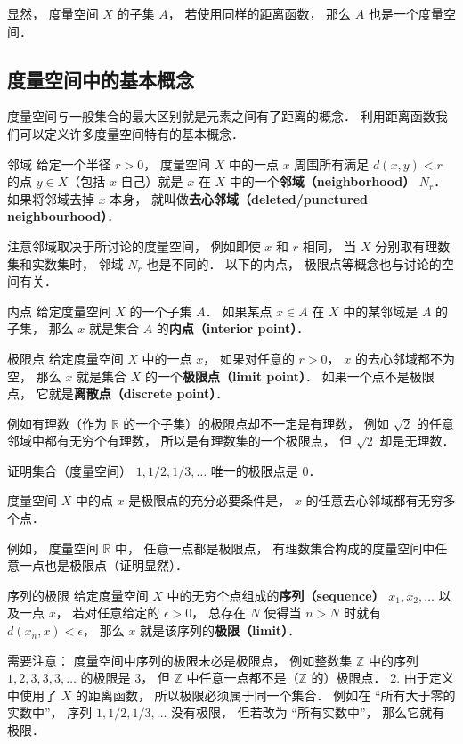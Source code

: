 显然， 度量空间 $X$ 的子集 $A$， 若使用同样的距离函数， 那么 $A$ 也是一个度量空间．

\subsection{度量空间中的基本概念}
度量空间与一般集合的最大区别就是元素之间有了距离的概念． 利用距离函数我们可以定义许多度量空间特有的基本概念．

\begin{definition}{邻域}
给定一个半径 $r > 0$， 度量空间 $X$ 中的一点 $x$ 周围所有满足 $d(x, y) < r$ 的点 $y \in X$（包括 $x$ 自己）就是 $x$ 在 $X$ 中的一个\textbf{邻域（neighborhood）} $N_r$． 如果将邻域去掉 $x$ 本身， 就叫做\textbf{去心邻域（deleted/punctured neighbourhood）}．
\end{definition}
注意邻域取决于所讨论的度量空间， 例如即使 $x$ 和 $r$ 相同， 当 $X$ 分别取有理数集和实数集时， 邻域 $N_r$ 也是不同的． 以下的内点， 极限点等概念也与讨论的空间有关．

\begin{definition}{内点}
给定度量空间 $X$ 的一个子集 $A$． 如果某点 $x\in A$ 在 $X$ 中的某邻域是 $A$ 的子集， 那么 $x$ 就是集合 $A$ 的\textbf{内点（interior point）}．
\end{definition}

\begin{definition}{极限点}
给定度量空间 $X$ 中的一点 $x$， 如果对任意的 $r > 0$， $x$ 的去心邻域都不为空， 那么 $x$ 就是集合 $X$ 的一个\textbf{极限点（limit point）}． 如果一个点不是极限点， 它就是\textbf{离散点（discrete point）}．
\end{definition}
例如有理数（作为 $\mathbb R$ 的一个子集）的极限点却不一定是有理数， 例如 $\sqrt{2}$ 的任意邻域中都有无穷个有理数， 所以是有理数集的一个极限点， 但 $\sqrt{2}$ 却是无理数．

\begin{exercise}{}
证明集合（度量空间） ${1, 1/2, 1/3, \dots}$ 唯一的极限点是 $0$．
\end{exercise}

\begin{corollary}{}
度量空间 $X$ 中的点 $x$ 是极限点的充分必要条件是， $x$ 的任意去心邻域都有无穷多个点．
\end{corollary}

例如， 度量空间 $\mathbb R$ 中， 任意一点都是极限点， 有理数集合构成的度量空间中任意一点也是极限点（证明显然）．

\begin{definition}{序列的极限}
给定度量空间 $X$ 中的无穷个点组成的\textbf{序列（sequence）} $x_1, x_2, \dots$ 以及一点 $x$， 若对任意给定的 $\epsilon > 0$， 总存在 $N$ 使得当 $n > N$ 时就有 $d(x_n, x) < \epsilon$， 那么 $x$ 就是该序列的\textbf{极限（limit）}．
\end{definition}
需要注意： 度量空间中序列的极限未必是极限点， 例如整数集 $\mathbb Z$ 中的序列 $1, 2, 3, 3, 3, \dots$ 的极限是 $3$， 但 $\mathbb Z$ 中任意一点都不是（$\mathbb Z$ 的）极限点． 2. 由于定义中使用了 $X$ 的距离函数， 所以极限必须属于同一个集合． 例如在 “所有大于零的实数中”， 序列 $1, 1/2, 1/3, \dots$ 没有极限， 但若改为 “所有实数中”， 那么它就有极限．

